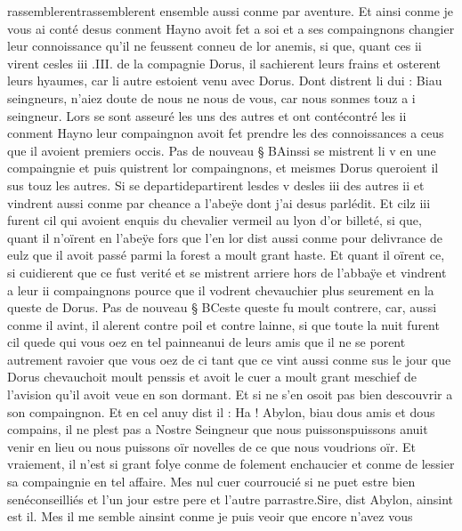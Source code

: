 \documentclass{article}
\begin{document}
\begin{pages}
   rassemblerentrassemblerent ensemble aussi conme par aventure. 
   Et ainsi conme je vous ai conté desus conment Hayno avoit fet a soi 
   et a ses compaingnons changier leur connoissance qu’il ne feussent conneu de lor anemis, si que, quant ces ii virent 
   cesles iii
      .III. de la compagnie Dorus, il sachierent leurs frains et osterent leurs hyaumes, 
   car li autre estoient venu avec Dorus. Dont 
   distrent li dui :
   Biau seingneurs, n’aiez doute de nous ne nous de vous, car nous sonmes touz a i 
      seingneur.
   Lors se sont asseuré les uns des autres et ont 
   contécontré 
   les ii conment Hayno leur compaingnon avoit fet prendre les 
   des connoissances a ceus que il avoient premiers occis. \pend
\pstart Pas de nouveau § BAinssi se mistrent li v en une compaingnie 
   et puis quistrent lor compaingnons, et meismes Dorus queroient il sus touz les autres. Si se 
   departidepartirent 
   lesdes v 
   desles iii 
   des autres ii et vindrent aussi conme par cheance a l’abeÿe 
   dont j’ai desus parlédit. Et cilz iii 
   furent cil qui avoient enquis du chevalier vermeil au lyon d’or billeté, si que, quant il n’oïrent en 
   l’abeÿe fors que l’en lor dist aussi conme pour delivrance de 
      eulz que il avoit passé parmi la forest a moult grant haste. 
   Et quant il oïrent ce, si cuidierent que ce fust verité et se mistrent arriere hors de l’abbaÿe 
   et vindrent a leur ii compaingnons pource que il vodrent chevauchier plus 
   seurement en la queste de Dorus. \pend
\pstart Pas de nouveau § BCeste queste fu moult contrere, car, 
   aussi conme il avint, il alerent contre poil et contre lainne, si que toute la nuit furent cil 
   quede qui vous oez en tel 
   painneanui de leurs amis que il ne se porent autrement ravoier que vous 
   oez de ci tant que ce vint aussi conme sus le jour que Dorus chevauchoit moult penssis 
   et avoit le cuer a moult grant meschief de l’avision qu’il avoit veue en son dormant. Et si ne s’en osoit pas bien descouvrir 
   a son compaingnon. Et en cel anuy dist il :
   Ha ! Abylon, biau 
      dous amis 
      et dous compains, il ne plest pas a Nostre Seingneur que nous 
      puissonspuissons anuit venir en lieu ou nous puissons oïr novelles 
      de ce que nous voudrions oïr. Et vraiement, il n’est si grant folye conme de folement enchaucier et conme de lessier sa compaingnie 
      en tel affaire. Mes nul cuer courroucié si ne puet estre bien senéconseilliés 
      et l’un jour estre pere et l’autre parrastre.Sire, dist Abylon, ainsint est 
      il. Mes il me semble ainsint conme je puis veoir que encore n’avez vous 

\end{pages}
\end{document}
